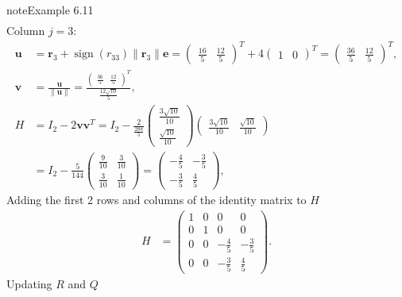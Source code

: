 \documentclass[letterpaper,10pt,english]{jupyterBook}
\begin{document}
\begin{sphinxadmonition}{note}{Example 6.11}
\begin{align*}
\end{align*}
\sphinxAtStartPar
Column \(j = 3\):
\begin{align*}
    \mathbf{u} &= \mathbf{r}_{3} + \operatorname{sign}(r_{33}) \| \mathbf{r}_{3} \| \mathbf{e} = \left(\begin{matrix}\frac{16}{5} & \frac{12}{5}\end{matrix}\right)^T + 4 \left(\begin{matrix}1 & 0\end{matrix}\right)^T = \left(\begin{matrix}\frac{36}{5} & \frac{12}{5}\end{matrix}\right)^T, \\
    \mathbf{v} &= \frac{\mathbf{u}}{\| \mathbf{u} \|} = \frac{\left(\begin{matrix}\frac{36}{5} & \frac{12}{5}\end{matrix}\right)^T}{\frac{12 \sqrt{10}}{5}}, \\
    H &= I_2 - 2\mathbf{vv}^T = I_2 - \frac{2}{\frac{288}{5}}\left(\begin{matrix}\frac{3 \sqrt{10}}{10}\\\frac{\sqrt{10}}{10}\end{matrix}\right)\left(\begin{matrix}\frac{3 \sqrt{10}}{10} & \frac{\sqrt{10}}{10}\end{matrix}\right) \\
      &= I_2 - \frac{5}{144}\left(\begin{matrix}\frac{9}{10} & \frac{3}{10}\\\frac{3}{10} & \frac{1}{10}\end{matrix}\right) = \left(\begin{matrix}- \frac{4}{5} & - \frac{3}{5}\\- \frac{3}{5} & \frac{4}{5}\end{matrix}\right),
\end{align*}
\sphinxAtStartPar
Adding the first 2 rows and columns of the identity matrix to \(H\)
\begin{align*}
    H &= \left(\begin{matrix}1 & 0 & 0 & 0\\0 & 1 & 0 & 0\\0 & 0 & - \frac{4}{5} & - \frac{3}{5}\\0 & 0 & - \frac{3}{5} & \frac{4}{5}\end{matrix}\right).
\end{align*}
\sphinxAtStartPar
Updating \(R\) and \(Q\)
\begin{align*}

\end{align*}
\end{sphinxadmonition}
\end{document}
